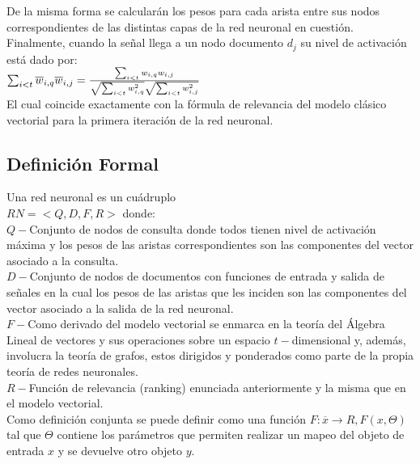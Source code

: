 \documentclass{llncs}
\begin{document}
\begin{multicols}{2}[]
De la misma forma se calcular\'an los pesos para cada arista entre sus nodos correspondien\-tes de las distintas capas de la red neuronal en cuesti\'on. Finalmente,
cuando la se\~nal llega a un nodo documento $d_j$ su nivel de activaci\'on est\'a dado por: \\

$\sum_{i < t}{\overline{w}_{i, q}\overline{w}_{i, j}} = \frac{\sum_{i < t}{w_{i,q}w_{i,j}}}{\sqrt{\sum_{i < t}{w^2_{i, q}}} \* \sqrt{\sum_{i < t}{w^2_{i, j}}}}$ \\

El cual coincide exactamente con la f\'ormula de relevancia del modelo cl\'asico vectorial para la primera iteraci\'on de la red neuronal.\\

\subsection{Definici\'on Formal}

Una red neuronal es un cu\'adruplo \\$RN = <Q, D, F, R>$ donde: \\

$Q - $Conjunto de nodos de consulta donde todos tienen nivel de activaci\'on m\'axima y los pesos de las aristas correspondientes son las componentes del vector
asociado a la consulta.\\

$D - $Conjunto de nodos de documentos con funciones de entrada y salida de se\~nales en la cual los pesos de las aristas que les inciden son las componentes del
vector asociado a la salida de la red neuronal.\\

$F - $Como derivado del modelo vectorial se enmarca en la teor\'ia del \'Algebra Lineal de vectores y sus operaciones sobre un espacio $t-$dimensional y, adem\'as,
involucra la teor\'ia de grafos, estos dirigidos y ponderados como parte de la propia teor\'ia de redes neuronales.\\

$R -$Funci\'on de relevancia (ranking) enuncia\-da anteriormente y la misma que en el modelo vectorial.\\

Como definici\'on conjunta se puede definir como una funci\'on $F:\overline{x} \rightarrow R, F(x, \Theta)$ tal que $\Theta$ contiene los par\'ametros
que permiten realizar un mapeo del objeto de entrada $x$ y se devuelve otro objeto $y$.\\


\end{multicols}
\end{document}
